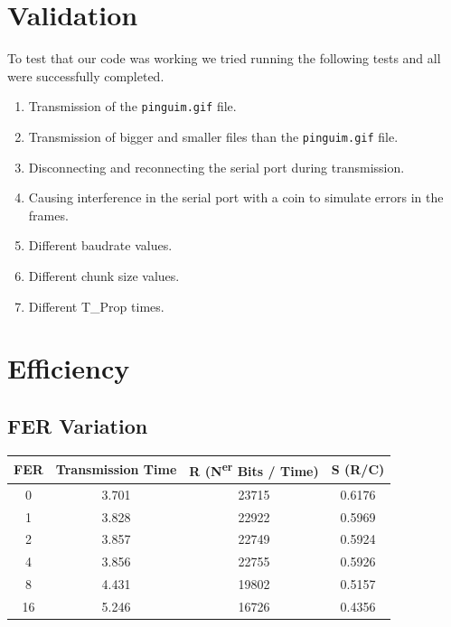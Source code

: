 \documentclass[11pt]{report}
\begin{document}
\chapter{Validation}
To test that our code was working we tried running the following tests and all were successfully completed.

\begin{enumerate}
    \item Transmission of the \texttt{pinguim.gif} file.
    \item Transmission of bigger and smaller files than the \texttt{pinguim.gif} file.
    \item Disconnecting and reconnecting the serial port during transmission.
    \item Causing interference in the serial port with a coin to simulate errors in the frames.
    \item Different baudrate values.
    \item Different chunk size values.
    \item Different T\_Prop times.
\end{enumerate}

\chapter{Efficiency}

\section{FER Variation}


\begin{center}
\begin{tabular}{ |c|c|c|c| } 
\hline
FER & Transmission Time & R (N\textsuperscript{er} Bits / Time) & S (R/C)  \\
\hline
0 & 3.701 & 23715 & 0.6176 \\
1 & 3.828 & 22922 & 0.5969 \\
2 & 3.857 & 22749 & 0.5924 \\
4 & 3.856 & 22755 & 0.5926 \\
8 & 4.431 & 19802 & 0.5157 \\
16 & 5.246 & 16726 & 0.4356 \\
\hline
\end{tabular}
\end{center}
\end{document}
